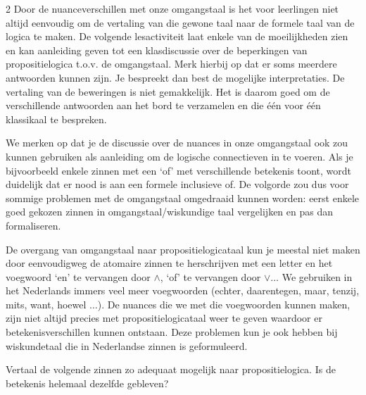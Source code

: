 \begin{multicols}{2}
Door de nuanceverschillen met onze omgangstaal is het voor leerlingen niet altijd eenvoudig om de vertaling van die  gewone taal naar de formele taal van de logica te maken. De volgende lesactiviteit laat enkele van de moeilijkheden zien en kan aanleiding geven tot een klasdiscussie over de beperkingen van propositielogica t.o.v. de omgangstaal. Merk hierbij op dat er soms meerdere antwoorden kunnen zijn. Je bespreekt dan best de mogelijke interpretaties. De vertaling van de beweringen is niet gemakkelijk. Het is daarom goed om de verschillende antwoorden aan het bord te verzamelen en die één voor één klassikaal te bespreken.

We merken op dat je de discussie over de nuances in onze omgangstaal ook zou kunnen gebruiken als aanleiding om de logische connectieven in te voeren. Als je bijvoorbeeld enkele zinnen met een `of' met verschillende betekenis toont, wordt duidelijk dat er nood is aan een formele inclusieve of. De volgorde zou dus voor sommige problemen met de omgangstaal omgedraaid kunnen worden: eerst enkele goed gekozen zinnen in omgangstaal/wiskundige taal vergelijken en pas dan formaliseren.

\end{multicols}

De overgang van omgangstaal naar propositielogicataal kun je meestal niet maken door eenvoudigweg de atomaire zinnen te herschrijven met een letter en het voegwoord `en' te vervangen door $\land$,  `of' te vervangen door $\lor \ldots$ We gebruiken in het Nederlands immers veel meer voegwoorden (echter, daarentegen, maar, tenzij, mits, want, hoewel $\ldots$). De nuances die we met die voegwoorden kunnen maken, zijn niet altijd precies met propositielogicataal weer te geven waardoor er betekenisverschillen kunnen ontstaan. Deze problemen kun je ook hebben bij wiskundetaal die in Nederlandse zinnen is geformuleerd.

Vertaal de volgende zinnen zo adequaat mogelijk naar propositielogica. Is de betekenis helemaal dezelfde gebleven? 


